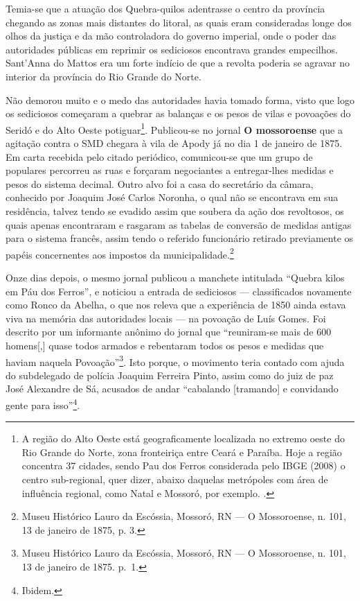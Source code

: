 \begin{refsection}
Temia-se que a atuação dos Quebra-quilos adentrasse o centro da província chegando as zonas mais distantes do litoral, as quais eram consideradas longe dos olhos da justiça e da mão controladora do governo imperial, onde o poder das autoridades públicas em reprimir os sediciosos encontrava grandes empecilhos. Sant’Anna do Mattos era um forte indício de que a revolta poderia se agravar no interior da província do Rio Grande do Norte.  

Não demorou muito e o medo das autoridades havia tomado forma, visto que logo os sediciosos começaram a quebrar as balanças e os pesos de vilas e povoações do Seridó e do Alto Oeste potiguar\footnote{A região do Alto Oeste está geograficamente localizada no extremo oeste do Rio Grande do Norte, zona fronteiriça entre Ceará e Paraíba. Hoje a região concentra 37 cidades, sendo Pau dos Ferros considerada pelo IBGE (2008) o centro sub-regional, quer dizer, abaixo daquelas metrópoles com área de influência regional, como Natal e Mossoró, por exemplo. \cite{DantasAndSilva2011}.}. Publicou-se no jornal \textbf{O mossoroense} que a agitação contra o SMD chegara à vila de Apody já no dia 1 de janeiro de 1875. Em carta recebida pelo citado periódico, comunicou-se que um grupo de populares percorreu as ruas e forçaram negociantes a entregar-lhes medidas e pesos do sistema decimal. Outro alvo foi a casa do secretário da câmara, conhecido por Joaquim José Carlos Noronha, o qual não se encontrava em sua residência, talvez tendo se evadido assim que soubera da ação dos revoltosos, os quais apenas encontraram e rasgaram as tabelas de conversão de medidas antigas para o sistema francês, assim tendo o referido funcionário retirado previamente os papéis concernentes aos impostos da municipalidade.\footnote{Museu Histórico Lauro da Escóssia, Mossoró, RN --- O Mossoroense, n. 101, 13 de janeiro de 1875, p. 3.}  

Onze dias depois, o mesmo jornal publicou a manchete intitulada “Quebra kilos em Páu dos Ferros”, e noticiou a entrada de sediciosos --- classificados novamente como Ronco da Abelha, o que nos releva que a experiência de 1850 ainda estava viva na memória das autoridades locais --- na povoação de Luís Gomes. Foi descrito por um informante anônimo do jornal que “reuniram-se mais de 600 homens[,] quase todos armados e rebentaram todos os pesos e medidas que haviam naquela Povoação”\footnote{Museu Histórico Lauro da Escóssia, Mossoró, RN --- O Mossoroense, n. 101, 13 de janeiro
de 1875. p.~1.}. Isto porque, o movimento teria contado com ajuda do subdelegado de polícia Joaquim Ferreira Pinto, assim como do juiz de paz José Alexandre de Sá, acusados de andar “cabalando [tramando] e convidando gente para isso”\footnote{Ibidem.}.


\end{refsection}
